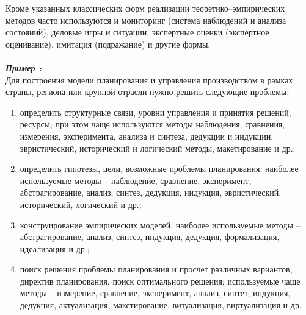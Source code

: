 Кроме указанных классических форм реализации теоретико--эмпирических методов часто используются и мониторинг (система наблюдений и анализа состояний), деловые игры и ситуации, экспертные оценки (экспертное оценивание), имитация (подражание) и другие формы.\\
\\\emph{\textbf{Пример :}}
\\Для построения модели планирования и управления производством в рамках страны, региона или крупной отрасли нужно решить следующие проблемы:
\begin{enumerate}
\item определить структурные связи, уровни управления и принятия решений, ресурсы; при этом чаще используются методы наблюдения, сравнения, измерения, эксперимента, анализа и синтеза, дедукции и индукции, эвристический, исторический и логический методы, макетирование и др.;
\item определить гипотезы, цели, возможные проблемы планирования; наиболее используемые методы – наблюдение, сравнение, эксперимент, абстрагирование, анализ, синтез, дедукция, индукция, эвристический, исторический, логический и др.;
\item конструирование эмпирических моделей; наиболее используемые методы – абстрагирование, анализ, синтез, индукция, дедукция, формализация, идеализация и др.;
\item поиск решения проблемы планирования и просчет различных вариантов, директив планирования, поиск оптимального решения; используемые чаще методы -- измерение, сравнение, эксперимент, анализ, синтез, индукция, дедукция, актуализация, макетирование, визуализация, виртуализация и др.
\end{enumerate}